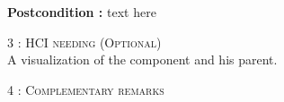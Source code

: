 \begin{flushleft}
    \textbf{\large Postcondition :} text here

    \BlackLine
    \textsc{\Large 3 : HCI needing (Optional)}\\[0.3cm]

    A visualization of the component and his parent.

    \BlackLine
    \textsc{\Large 4 : Complementary remarks}\\[0.3cm]

\end{flushleft}
